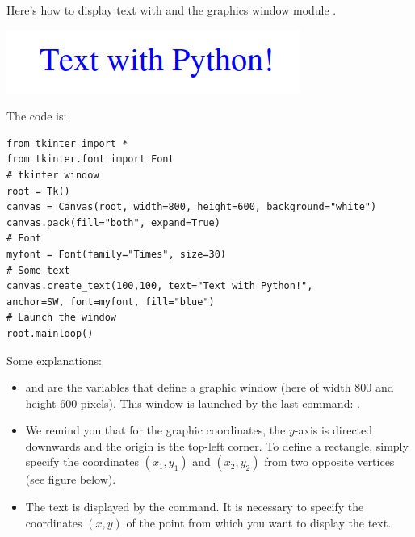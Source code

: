 \documentclass[11pt,class=report,crop=false]{standalone}
\begin{document}




\begin{cours}
Here's how to display text with \Python{} and the graphics window module 
.


\begin{center}
\includegraphics[scale=0.6]{screen-markdown-7-en}
\end{center}
The code is:
\begin{lstlisting}
from tkinter import *
from tkinter.font import Font
# tkinter window
root = Tk()  
canvas = Canvas(root, width=800, height=600, background="white")
canvas.pack(fill="both", expand=True)
# Font
myfont = Font(family="Times", size=30)
# Some text
canvas.create_text(100,100, text="Text with Python!", 
anchor=SW, font=myfont, fill="blue")
# Launch the window
root.mainloop()
\end{lstlisting}


Some explanations:
\begin{itemize}
  \item {} and  are the variables that define a graphic window (here of width $800$ and height $600$ pixels). This window is launched by the last command: .
  
  \item We remind you that for the graphic coordinates, the $y$-axis is directed downwards and the origin is the top-left corner. To define a rectangle, simply specify the coordinates $(x_1,y_1)$ and $(x_2,y_2)$ from two opposite vertices (see figure below). 
  
  \item The text is displayed by the  command. It is necessary to specify the coordinates $(x,y)$ of the point from which you want to display the text. 
  

\end{itemize}
\end{cours}
\end{document}
